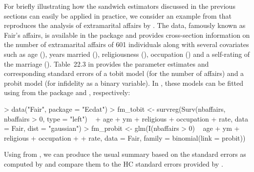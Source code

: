 \documentclass{Z}
\begin{document}
For briefly illustrating how the sandwich estimators discussed in the
previous sections can easily be applied in practice, we consider an
example from \citet[Section~22.3.6]{hac:Greene:2003} that reproduces
the analysis of extramarital affairs by \citet{hac:Fair:1978}. The data,
famously known as Fair's affairs, is available in the  package
\citep{hac:Croissant:2005} and provides cross-section information on the number
of extramarital affairs of 601 individuals along with several covariates such
as age (), years married (), religiousness (),
occupation () and a self-rating of the marriage ().
Table~22.3 in \cite{hac:Greene:2003} provides the parameter estimates and corresponding
standard errors of a tobit model (for the number of affairs) and a probit model
(for infidelity as a binary variable). In , these models can be
fitted using  from the  package \citep{hac:Thernau+Lumley:2006}
and , respectively:

\begin{Schunk}
\begin{Sinput}
> data("Fair", package = "Ecdat")
> fm_tobit <- survreg(Surv(nbaffairs, nbaffairs > 0, type = "left") ~ 
+     age + ym + religious + occupation + rate, data = Fair, dist = "gaussian")
> fm_probit <- glm(I(nbaffairs > 0) ~ age + ym + religious + occupation + 
+     rate, data = Fair, family = binomial(link = probit))
\end{Sinput}
\end{Schunk}

Using  from  \citep{hac:Zeileis+Hothorn:2002},
we can produce the usual summary based on the standard errors as computed by
 \citep[which reproduces the results in][]{hac:Greene:2003}
and compare them to the HC standard errors provided by .
\end{document}
